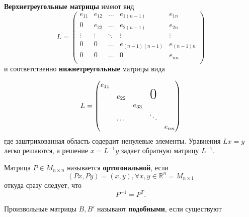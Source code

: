 \textbf{Верхнетреугольные матрицы} имеют вид
\begin{equation}
	L = \begin{pmatrix}
		e_{11} & e_{12} & \dots &e_{1(n-1)}&e_{1n} \\
		0 & e_{22} & \dots &e_{2(n-1)}&e_{2n} \\
		\vdots & \vdots & \ddots &\vdots &  \vdots\\
		0 & 0 & \dots & e_{(n-1)(n-1)} &e_{(n-1)n} \\
		0 & 0 & \dots & 0 &e_{nn} \\
	\end{pmatrix}
\end{equation}
и соответственно \textbf{нижнетреугольные} матрицы вида 

\begin{equation}
	L = \begin{pmatrix}
		e_{11}	&		&		&	&        \\
				&e_{22}	&   		& \text{\huge0} &\\
      			&		&e_{33} &	&            \\
      			&\dots & & \ddots &          \\
      			& 		&   		&   & e_{nn} 
	\end{pmatrix}
\end{equation}
где заштрихованная область содердит ненулевые элементы. Уравнения $Lx = y$ легко решаются, а решение $x = L^{-1}y$ задает обратную матрицу $L^{-1}$.


Матрица $P \in M_{n \times n}$ называется \textbf{ортогональной}, если
\begin{equation}
	(Px, Py) = (x, y), \forall x, y \in \mathbb{R}^n = M_{n \times 1}
\end{equation}
откуда сразу следует, что
\begin{equation}
	P^{-1} = P^T .
\end{equation}

Произвольные матрицы $B, B'$ называют \textbf{подобными}, если существуют






